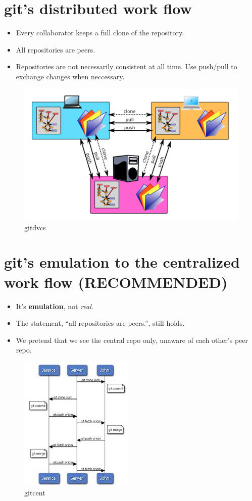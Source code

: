 \documentclass[]{article}
\makeatletter
\def\maxwidth{\ifdim\Gin@nat@width>\linewidth\linewidth
\else\Gin@nat@width\fi}
\let\Oldincludegraphics\includegraphics
\renewcommand{\includegraphics}[1]{\Oldincludegraphics[width=\maxwidth]{#1}}
\makeatother
\begin{document}
\section{git's distributed work flow}

\begin{itemize}
\item
  Every collaborator keeps a full clone of the repository.
\item
  All repositories are peers.
\item
  Repositories are not necessarily consistent at all time. Use push/pull
  to exchange changes when neccessary.
\end{itemize}
\begin{figure}[htbp]
\centering
\includegraphics{figures/gitdvcs.png}
\caption{gitdvcs}
\end{figure}

\section{git's emulation to the centralized work flow
(\textbf{RECOMMENDED})}

\begin{itemize}
\item
  It's \textbf{emulation}, not \emph{real}.\\
\item
  The statement, ``all repositories are peers.'', still holds.
\item
  We pretend that we see the central repo only, unaware of each other's
  peer repo.
\end{itemize}
\begin{figure}[htbp]
\centering
\includegraphics{figures/gitcent.jpeg}
\caption{gitcent}
\end{figure}
\end{document}
